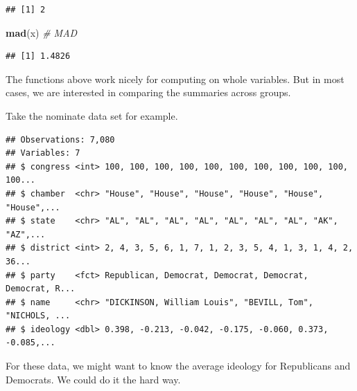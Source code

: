 \documentclass[]{book}
\newenvironment{Shaded}{\begin{snugshade}}{\end{snugshade}}
\newcommand{\CommentTok}[1]{\textcolor[rgb]{0.56,0.35,0.01}{\textit{#1}}}
\newcommand{\DataTypeTok}[1]{\textcolor[rgb]{0.13,0.29,0.53}{#1}}
\newcommand{\KeywordTok}[1]{\textcolor[rgb]{0.13,0.29,0.53}{\textbf{#1}}}
\newcommand{\NormalTok}[1]{#1}
\newcommand{\OperatorTok}[1]{\textcolor[rgb]{0.81,0.36,0.00}{\textbf{#1}}}
\newcommand{\OtherTok}[1]{\textcolor[rgb]{0.56,0.35,0.01}{#1}}
\newcommand{\StringTok}[1]{\textcolor[rgb]{0.31,0.60,0.02}{#1}}
\begin{document}
\begin{verbatim}
## [1] 2
\end{verbatim}

\begin{Shaded}
\begin{Highlighting}[]
\KeywordTok{mad}\NormalTok{(x)  }\CommentTok{# MAD}
\end{Highlighting}
\end{Shaded}

\begin{verbatim}
## [1] 1.4826
\end{verbatim}

The functions above work nicely for computing on whole variables. But in most cases, we are interested in comparing the summaries across groups.

Take the nominate data set for example.

\begin{Shaded}
\end{Shaded}

\begin{verbatim}
## Observations: 7,080
## Variables: 7
## $ congress <int> 100, 100, 100, 100, 100, 100, 100, 100, 100, 100, 100...
## $ chamber  <chr> "House", "House", "House", "House", "House", "House",...
## $ state    <chr> "AL", "AL", "AL", "AL", "AL", "AL", "AL", "AK", "AZ",...
## $ district <int> 2, 4, 3, 5, 6, 1, 7, 1, 2, 3, 5, 4, 1, 3, 1, 4, 2, 36...
## $ party    <fct> Republican, Democrat, Democrat, Democrat, Democrat, R...
## $ name     <chr> "DICKINSON, William Louis", "BEVILL, Tom", "NICHOLS, ...
## $ ideology <dbl> 0.398, -0.213, -0.042, -0.175, -0.060, 0.373, -0.085,...
\end{verbatim}

For these data, we might want to know the average ideology for Republicans and Democrats. We could do it the hard way.

\begin{Shaded}
\end{Shaded}
\end{document}
